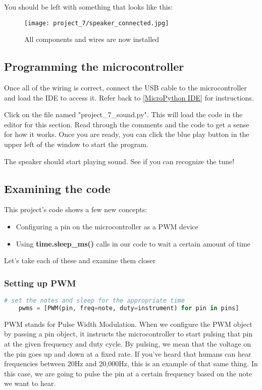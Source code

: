 You should be left with something that looks like this:
\begin{figure}[H]
    \centering
    \texttt{[image: project\_7/speaker\_connected.jpg]}
    \caption{All components and wires are now installed}
\end{figure}

\subsection{Programming the microcontroller}
Once all of the wiring is correct, connect the USB cable to the microcontroller and load the IDE to
access it. Refer back to \ref{MicroPython IDE} for instructions.

Click on the file named "project\_7\_sound.py". This will load the code in the editor for this section. Read through the comments
and the code to get a sense for how it works. Once you are ready, you can click the blue play button in the upper left of the window
to start the program.

The speaker should start playing sound. See if you can recognize the tune!

\subsection{Examining the code}

This project's code shows a few new concepts:
\begin{itemize}
    \item Configuring a pin on the microcontroller as a PWM device
    \item Using \textbf{time.sleep\_ms()} calls in our code to wait a certain amount of time
\end{itemize}

Let's take each of these and examine them closer

\subsubsection{Setting up PWM}
\begin{lstlisting}[language=Python,caption=PWM Mode]
    # set the notes and sleep for the appropriate time
    pwms = [PWM(pin, freq=note, duty=instrument) for pin in pins]
\end{lstlisting}

PWM stands for Pulse Width Modulation. When we configure the PWM object by passing
a pin object, it instructs the microcontroller to start pulsing that pin at the given
frequency and duty cycle. By pulsing, we mean that the voltage on the pin goes up and
down at a fixed rate. If you've heard that humans can hear frequencies between 20Hz and 20,000Hz,
this is an example of that same thing. In this case, we are going to pulse the pin at
a certain frequency based on the note we want to hear.

